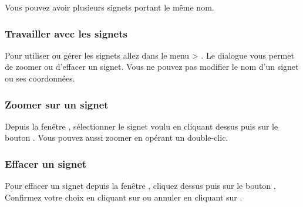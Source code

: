 Vous pouvez avoir plusieurs signets portant le même nom.

%

\subsubsection{Travailler avec les signets}
Pour utiliser ou gérer les signets allez dans le menu  > .
Le dialogue  vous permet de zoomer ou d'effacer un signet.
Vous ne pouvez pas modifier le nom d'un signet ou ses coordonnées.

\subsubsection{Zoomer sur un signet}
Depuis la fenêtre , sélectionner le signet voulu en cliquant dessus puis sur le bouton . Vous pouvez aussi zoomer en opérant un double-clic.


\subsubsection{Effacer un signet}
Pour effacer un signet depuis la fenêtre , cliquez dessus puis sur le bouton .
Confirmez votre choix en cliquant sur  ou annuler en cliquant sur .
